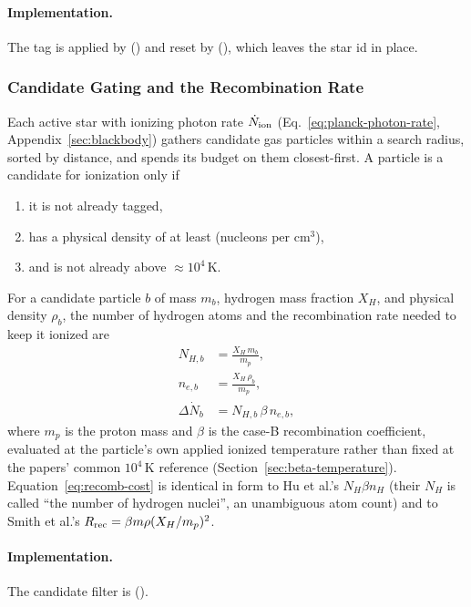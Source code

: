 \paragraph{Implementation.} The tag is applied by 
() and reset by
 (),
which leaves the star id in place.

\subsubsection{Candidate Gating and the Recombination Rate}

Each active star with ionizing photon rate $\dot N_{\rm ion}$
(Eq.~\ref{eq:planck-photon-rate}, Appendix~\ref{sec:blackbody}) gathers
candidate gas particles within a search radius, sorted by distance,
and spends its budget on them closest-first. A particle is a candidate
for ionization only if

\begin{enumerate}
\item it is not already tagged,
\item has a physical density of at least
   (nucleons per cm$^3$),
\item and is not already above $\approx 10^4\,$K.
\end{enumerate}

For a candidate particle $b$ of mass $m_b$, hydrogen mass fraction $X_H$,
and physical density $\rho_b$, the number of hydrogen atoms and the
recombination rate needed to keep it ionized are
\begin{align}
  N_{H,b} &= \frac{X_H\, m_b}{m_p}, \\
  n_{e,b} &= \frac{X_H\, \rho_b}{m_p}, \\
  \Delta \dot N_b &= N_{H,b}\, \beta\, n_{e,b},
  \label{eq:recomb-cost}
\end{align}
where $m_p$ is the proton mass and $\beta$ is the case-B recombination
coefficient, evaluated at the particle's own applied ionized
temperature rather than fixed at the papers' common $10^4\,$K
reference (Section~\ref{sec:beta-temperature}).
Equation~\ref{eq:recomb-cost} is
identical in form to Hu et al.'s $N_H\beta n_H$ (their $N_H$ is called
``the number of hydrogen nuclei'', an unambiguous atom count) and to
Smith et al.'s $R_{\rm rec}=\beta m \rho (X_H/m_p)^2$. 

\paragraph{Implementation.} The candidate filter is 
().

